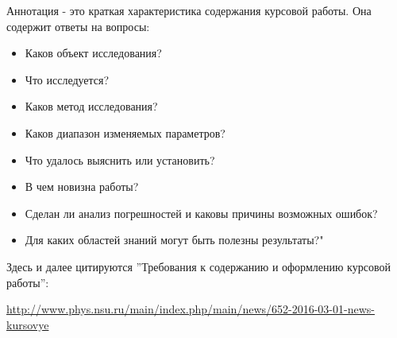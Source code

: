 \Abstract
Аннотация - это краткая характеристика содержания курсовой работы. Она содержит ответы на вопросы: 
\begin{itemize}
	\item Каков объект исследования?
	\item Что исследуется? 
	\item Каков метод исследования?
	\item Каков диапазон изменяемых параметров?
	\item Что удалось выяснить или установить?
	\item В чем новизна	работы? 
	\item Сделан ли анализ погрешностей и каковы причины возможных ошибок? 
	\item Для каких	областей знаний могут быть полезны результаты?"
\end{itemize}

Здесь и далее цитируются ''Требования к содержанию и оформлению курсовой работы'':

\href{http://www.phys.nsu.ru/main/index.php/main/news/652-2016-03-01-news-kursovye}{\small http://www.phys.nsu.ru/main/index.php/main/news/652-2016-03-01-news-kursovye}


\InputKeyWords%